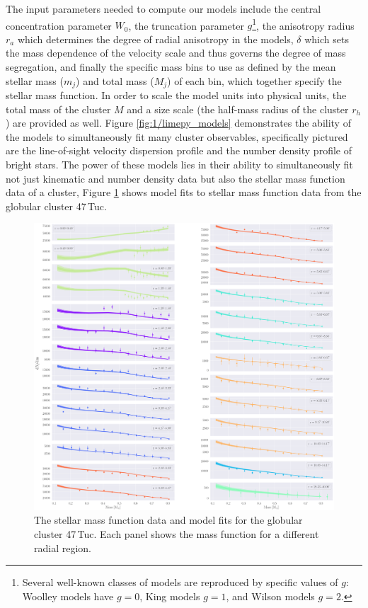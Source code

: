 The input parameters needed to compute our models include the central concentration parameter $W_0$,
the truncation parameter $g$\footnote{Several well-known classes of models are reproduced by
	specific values of $g$: Woolley models \citep{Woolley1954} have $g=0$, King models \citep{King1966}
	$g=1$, and Wilson models \citep{Wilson1975} $g=2$.}, the anisotropy radius $r_a$ which determines
the degree of radial anisotropy in the models, $\delta$ which sets the mass dependence of the
velocity scale and thus governs the degree of mass segregation, and finally the specific mass bins
to use as defined by the mean stellar mass ($m_j$) and total mass ($M_j$) of each bin, which
together specify the stellar mass function. In order to scale the model units into physical units,
the total mass of the cluster $M$ and a size scale (the half-mass radius of the cluster $r_h$) are
provided as well. Figure \ref{fig:1/limepy_models} demonstrates the ability of the models to
simultaneously fit many cluster observables, specifically pictured are the line-of-sight velocity
dispersion profile and the number density profile of bright stars. The power of these models lies in
their ability to simultaneously fit not just kinematic and number density data but also the stellar
mass function data of a cluster, Figure \ref{fig:1/massfunc_fit} shows model fits to stellar mass
function data from the globular cluster 47\,Tuc.


\begin{figure}
	\centering
	\includegraphics[width=\textwidth]{./figures/prev_nobin/mass_fun.png}
	\caption{The stellar mass function data and model fits for the globular cluster 47\,Tuc.
		Each panel shows the mass function for a different radial region.}
	\label{fig:1/massfunc_fit}
\end{figure}


